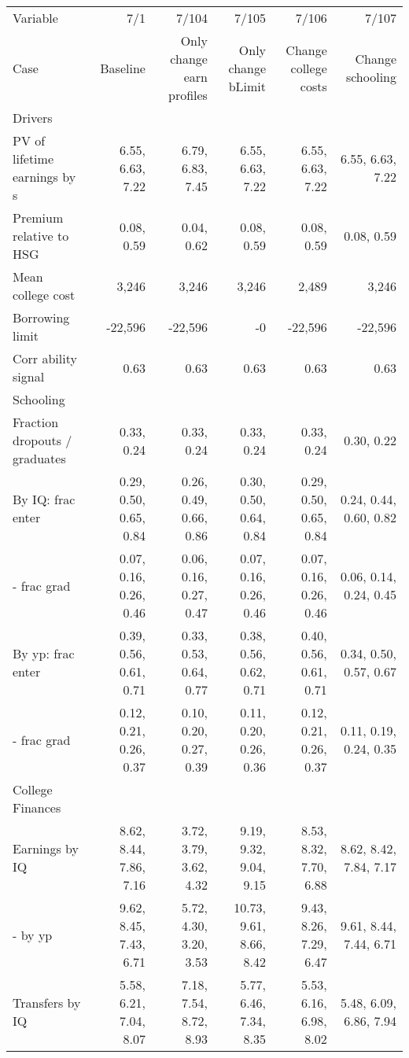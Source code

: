 \begin{tabular}{lrrrrr}
\hline
Variable & 7/1  & 7/104  & 7/105  & 7/106  & 7/107  \\
Case & Baseline  & Only change earn profiles  & Only change bLimit  & Change college costs  & Change schooling  \\
Drivers &   &   &   &   &   \\
PV of lifetime earnings by s & 6.55, 6.63, 7.22  & 6.79, 6.83, 7.45  & 6.55, 6.63, 7.22  & 6.55, 6.63, 7.22  & 6.55, 6.63, 7.22  \\
Premium relative to HSG & 0.08, 0.59  & 0.04, 0.62  & 0.08, 0.59  & 0.08, 0.59  & 0.08, 0.59  \\
Mean college cost & 3,246  & 3,246  & 3,246  & 2,489  & 3,246  \\
Borrowing limit & -22,596  & -22,596  & -0  & -22,596  & -22,596  \\
Corr ability signal & 0.63  & 0.63  & 0.63  & 0.63  & 0.63  \\
\hline
Schooling &   &   &   &   &   \\
Fraction dropouts / graduates & 0.33, 0.24  & 0.33, 0.24  & 0.33, 0.24  & 0.33, 0.24  & 0.30, 0.22  \\
By IQ: frac enter & 0.29, 0.50, 0.65, 0.84  & 0.26, 0.49, 0.66, 0.86  & 0.30, 0.50, 0.64, 0.84  & 0.29, 0.50, 0.65, 0.84  & 0.24, 0.44, 0.60, 0.82  \\
- frac grad & 0.07, 0.16, 0.26, 0.46  & 0.06, 0.16, 0.27, 0.47  & 0.07, 0.16, 0.26, 0.46  & 0.07, 0.16, 0.26, 0.46  & 0.06, 0.14, 0.24, 0.45  \\
By yp: frac enter & 0.39, 0.56, 0.61, 0.71  & 0.33, 0.53, 0.64, 0.77  & 0.38, 0.56, 0.62, 0.71  & 0.40, 0.56, 0.61, 0.71  & 0.34, 0.50, 0.57, 0.67  \\
- frac grad & 0.12, 0.21, 0.26, 0.37  & 0.10, 0.20, 0.27, 0.39  & 0.11, 0.20, 0.26, 0.36  & 0.12, 0.21, 0.26, 0.37  & 0.11, 0.19, 0.24, 0.35  \\
\hline
College Finances &   &   &   &   &   \\
Earnings by IQ & 8.62, 8.44, 7.86, 7.16  & 3.72, 3.79, 3.62, 4.32  & 9.19, 9.32, 9.04, 9.15  & 8.53, 8.32, 7.70, 6.88  & 8.62, 8.42, 7.84, 7.17  \\
- by yp & 9.62, 8.45, 7.43, 6.71  & 5.72, 4.30, 3.20, 3.53  & 10.73, 9.61, 8.66, 8.42  & 9.43, 8.26, 7.29, 6.47  & 9.61, 8.44, 7.44, 6.71  \\
Transfers by IQ & 5.58, 6.21, 7.04, 8.07  & 7.18, 7.54, 8.72, 8.93  & 5.77, 6.46, 7.34, 8.35  & 5.53, 6.16, 6.98, 8.02  & 5.48, 6.09, 6.86, 7.94  \\

\end{tabular}
